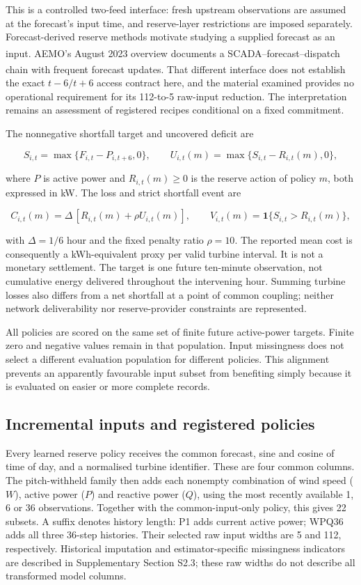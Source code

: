 \documentclass[
  british,
  11pt,
]{article}
\newcounter{none} %
\begin{document}
This is a controlled two-feed interface: fresh upstream observations are
assumed at the forecast's input time, and reserve-layer restrictions are
imposed separately. Forecast-derived reserve methods motivate studying a
supplied forecast as an
input\textsuperscript{}. AEMO's
August 2023 overview documents a SCADA--forecast--dispatch chain with
frequent forecast
updates\textsuperscript{}. That different
interface does not establish the exact \(t-6/t+6\) access contract here,
and the material examined provides no operational requirement for its
112-to-5 raw-input reduction. The interpretation remains an assessment
of registered recipes conditional on a fixed commitment.

The nonnegative shortfall target and uncovered deficit are

\[
S_{i,t}=\max\{F_{i,t}-P_{i,t+6},0\},\qquad
U_{i,t}(m)=\max\{S_{i,t}-R_{i,t}(m),0\},
\]

where \(P\) is active power and \(R_{i,t}(m)\geq0\) is the reserve
action of policy \(m\), both expressed in kW. The loss and strict
shortfall event are

\[
C_{i,t}(m)=\Delta\,[R_{i,t}(m)+\rho U_{i,t}(m)],\qquad
V_{i,t}(m)=\mathbf{1}\{S_{i,t}>R_{i,t}(m)\},
\]

with \(\Delta=1/6\) hour and the fixed penalty ratio \(\rho=10\). The
reported mean cost is consequently a kWh-equivalent proxy per valid
turbine interval. It is not a monetary settlement. The target is one
future ten-minute observation, not cumulative energy delivered
throughout the intervening hour. Summing turbine losses also differs
from a net shortfall at a point of common coupling; neither network
deliverability nor reserve-provider constraints are represented.

All policies are scored on the same set of finite future active-power
targets. Finite zero and negative values remain in that population.
Input missingness does not select a different evaluation population for
different policies. This alignment prevents an apparently favourable
input subset from benefiting simply because it is evaluated on easier or
more complete records.

\subsection{Incremental inputs and registered
policies}\label{incremental-inputs-and-registered-policies}

Every learned reserve policy receives the common forecast, sine and
cosine of time of day, and a normalised turbine identifier. These are
four common columns. The pitch-withheld family then adds each nonempty
combination of wind speed (\(W\)), active power (\(P\)) and reactive
power (\(Q\)), using the most recently available 1, 6 or 36
observations. Together with the common-input-only policy, this gives 22
subsets. A suffix denotes history length: P1 adds current active power;
WPQ36 adds all three 36-step histories. Their selected raw input widths
are 5 and 112, respectively. Historical imputation and
estimator-specific missingness indicators are described in Supplementary
Section S2.3; these raw widths do not describe all transformed model
columns.
\end{document}
